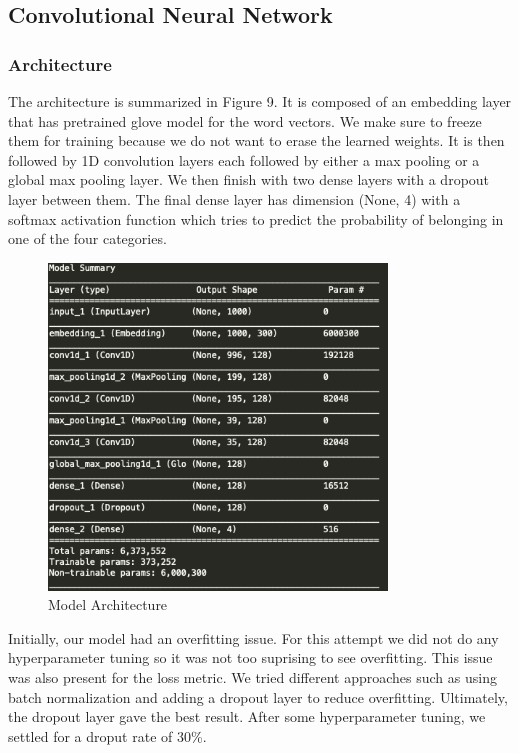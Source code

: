 \documentclass[12pt]{article}
\begin{document}
\begin{center}
\subsection{Convolutional Neural Network}
\end{center}


\subsubsection{Architecture}

The architecture is summarized in Figure 9. It is composed of an embedding layer that has pretrained glove model for the word vectors. We make sure to freeze them for training because we do not want to erase the learned weights. It is then followed by 1D convolution layers each followed by either a max pooling or a global max pooling layer. We then finish with two dense layers with a dropout layer between them. The final dense layer has dimension (None, 4) with a softmax activation function which tries to predict the probability of belonging in one of the four categories.


\begin{figure}[ht!]
\center
\includegraphics[width=90mm]{model_architecture.png}
    \caption{Model Architecture}
    \label{instances_classes}
\end{figure}




Initially, our model had an overfitting issue. For this attempt we did not do any hyperparameter tuning so it was not too suprising to see overfitting. This issue was also present for the loss metric. We tried different approaches such as using batch normalization and adding a dropout layer to reduce overfitting. Ultimately, the dropout layer gave the best result. After some hyperparameter tuning, we settled for a droput rate of 30\%.
\end{document}
